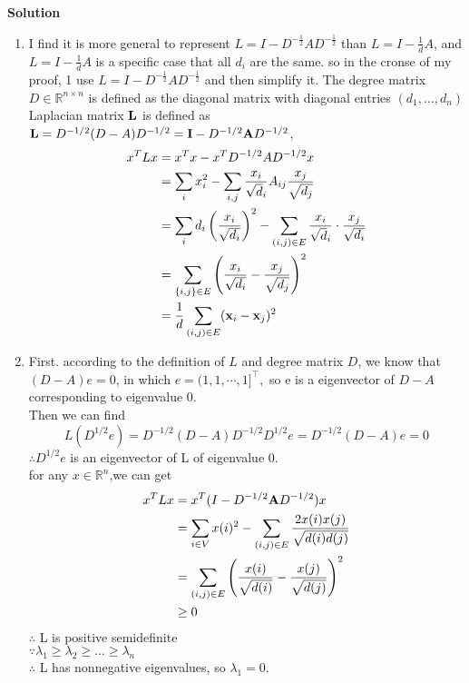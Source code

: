 \documentclass[english,onecolumn]{IEEEtran}
\newcommand{\bA}{{\bf A}}
\newcommand{\bI}{{\bf I}}
\newcommand{\bL}{{\bf L}}
\newcommand{\bx}{{\bf x}}
\begin{document}
\noindent
\textbf{Solution}
\begin{enumerate}
    \item 
    I find it is more general to represent
    $L=I-D^{-\frac{1}{2}} A D^{-\frac{1}{2}}$ than $L=I-\frac{1}{d} A$, and $L=I-\frac{1}{d} A$ is a specific
    case that all $d_i$ are the same.
    so in the cronse of $\mathrm{my}$ proof, 1 use $L=I-D^{-\frac{1}{2}} A D^{-\frac{1}{2}}$
    and then simplify it.
    The degree matrix $D \in \mathbb{R}^{n \times n}$ is defined as the diagonal matrix with diagonal entries $\left(d_{1}, \ldots, d_{n}\right)$\\
    Laplacian matrix $\bL$ is defined as $\bL=D^{-1 / 2}(D-A )D^{-1 / 2}  = \bI-D^{-1 / 2}\bA D^{-1 / 2}$,
    $$
    \begin{aligned}
    	x^{T} L x &=x^{T} x-x^{T} D^{-1 / 2} A D^{-1 / 2} x \\
    	&=\sum_{i} x_{i}^{2}-\sum_{i, j} \frac{x_{i}}{\sqrt{d}_{i}} A_{i j} \frac{x_{j}}{\sqrt{d_{j}}} \\
    	&=\sum_{i} d_{i}\left(\frac{x_{i}}{\sqrt{d_{i}}}\right)^{2}-\sum_{(i, j) \in E} \frac{x_{i}}{\sqrt{d}_{i}} \cdot \frac{x_{j}}{\sqrt{d_{i}}} \\
    	&=\sum_{\{i, j\} \in E}\left(\frac{x_{i}}{\sqrt{d_{i}}}-\frac{x_{j}}{\sqrt{d_{j}}}\right)^{2}\\
    	&=\frac{1}{d}\sum_{(i,j)\in E}(\bx_i-\bx_j)^2
    \end{aligned}
    $$
    
    \item First. according to the definition of $L$ and degree
    matrix $D$, we know that $(D-A) e=0$, in which
    $e=(1,1, \cdots, 1]^{\top},$ so e is a eigenvector of $D-A$ corresponding to eigenvalue $0 .$\\
    Then we can find
    $$
    L\left(D^{1 / 2} e\right)=D^{-1 / 2} (D-A) D^{-1 / 2} D^{1 / 2} e=D^{-1 / 2} (D-A) e=0
    $$
    $\therefore D^{1 / 2} e$ is an eigenvector of L of eigenvalue $0 .$\\ 
    for any $x \in \mathbb{R}^{n}$,we can get
    $$
    \begin{aligned}
    	x^{T} L x &=x^{T}(I-D^{-1 / 2}\bA D^{-1 / 2}) x \\
    	&=\sum_{i \in V} x(i)^{2}-\sum_{(i, j) \in E} \frac{2 x(i) x(j)}{\sqrt{d(i) d(j)}} \\
    	&=\sum_{(i, j) \in E}\left(\frac{x(i)}{\sqrt{d(i)}}-\frac{x(j)}{\sqrt{d(j)}}\right)^{2} \\
    	& \geq 0
    \end{aligned}
    $$
    $\therefore$ L is positive semidefinite\\
    $\because \lambda_{1} \geq \lambda_{2} \geq \ldots \geq \lambda_{n}$\\
    $\therefore$ L has nonnegative eigenvalues, so $\lambda_{1}=0$.\\
     

\end{enumerate}
\end{document}
